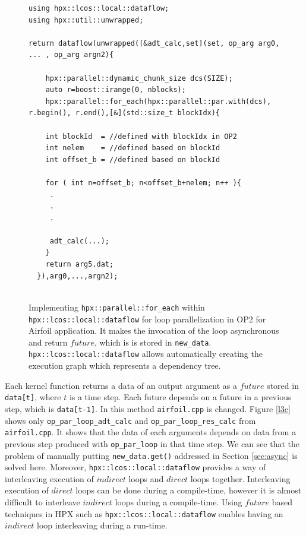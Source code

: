 \documentclass[conference]{IEEEtran}
\begin{document}
\begin{figure}
    \begin{lstlisting}    
using hpx::lcos::local::dataflow;
using hpx::util::unwrapped;    

return dataflow(unwrapped([&adt_calc,set](set, op_arg arg0, ... , op_arg argn2){

    hpx::parallel::dynamic_chunk_size dcs(SIZE);
    auto r=boost::irange(0, nblocks);
    hpx::parallel::for_each(hpx::parallel::par.with(dcs), r.begin(), r.end(),[&](std::size_t blockIdx){
  
    int blockId  = //defined with blockIdx in OP2
    int nelem    = //defined based on blockId 
    int offset_b = //defined based on blockId
        
    for ( int n=offset_b; n<offset_b+nelem; n++ ){
     .
     .
     .

     adt_calc(...);
    }
    return arg5.dat;
  }),arg0,...,argn2);
  
    \end{lstlisting}
    \caption{\small{Implementing \texttt{hpx::parallel::for\_each} within \texttt{hpx::lcos::local::dataflow} for loop parallelization in OP2 for Airfoil application. It makes the invocation of the loop asynchronous and return $future$, which is is stored in \texttt{new\_data}. \texttt{hpx::lcos::local::dataflow} allows automatically creating the execution graph which represents a dependency tree.}}
    \label{l3b}
\end{figure}



Each kernel function returns a data of an output argument as a $future$ stored in \texttt{data[t]}, where $t$ is a time step. Each future depends on a future in a previous step, which is \texttt{data[t-1]}. In this method \texttt{airfoil.cpp} is changed. Figure \ref{l3c} shows only \texttt{op\_par\_loop\_adt\_calc} and \texttt{op\_par\_loop\_res\_calc} from \texttt{airfoil.cpp}. It shows that the data of each arguments depends on data from a previous step produced with \texttt{op\_par\_loop} in that time step. We can see that the problem of manually putting \texttt{new\_data.get()} addressed in Section \ref{sec:async} is solved here.  Moreover, \texttt{hpx::lcos::local::dataflow} provides a way of interleaving execution of $indirect$ loops and $direct$ loops together. Interleaving execution of $direct$ loops can be done during a compile-time, however it is almost difficult to interleave $indirect$ loops during a compile-time. Using $future$ based techniques in HPX such as \texttt{hpx::lcos::local::dataflow} enables having an $indirect$ loop interleaving during a run-time.  
\end{document}
